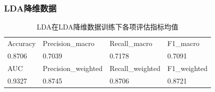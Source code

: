 \documentclass[10pt]{article}
\begin{document}
\subsubsection*{LDA降维数据}
\begin{table}[H]
  \centering
  \caption{LDA在LDA降维数据训练下各项评估指标均值}
  \begin{tabular}{llll}
  \toprule
  Accuracy & Precision\_macro & Recall\_macro & F1\_macro \\
  0.8706 & 0.7039 & 0.7178 & 0.7091 \\
  \midrule
  AUC & Precision\_weighted & Recall\_weighted & F1\_weighted \\
  0.9327 & 0.8745 & 0.8706 & 0.8721 \\
  \bottomrule
  \end{tabular}
\end{table}
\end{document}
